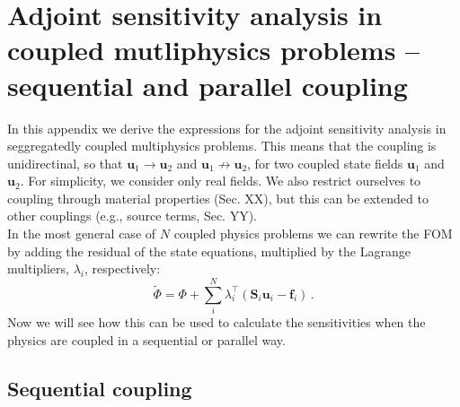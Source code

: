 \section{Adjoint sensitivity analysis in coupled mutliphysics problems -- sequential and parallel coupling}\label{app:appendix1}

In this appendix we derive the expressions for the adjoint sensitivity analysis in seggregatedly coupled multiphysics problems.
 This means that the coupling is unidirectinal, so that $\mathbf{u}_1 \to \mathbf{u}_2$ and $\mathbf{u}_1 \not\to \mathbf{u}_2$, for two
 coupled state fields $\mathbf{u}_1$ and $\mathbf{u}_2$. For simplicity, we consider
only real fields. We also restrict ourselves to coupling through material properties (Sec. XX), but this can be extended to other couplings
(e.g., source terms, Sec. YY).\\

In the most general case of $N$ coupled physics problems we can rewrite the FOM by adding the residual
of the state equations, multiplied by the Lagrange multipliers, $\lambda_i$, 
respectively:
\begin{equation}\label{eq:adj_init}
    \tilde{\Phi} =\Phi + \sum^N_i \lambda_{i}^{\top}\left(\mathbf{S}_i \mathbf{u}_i -\mathbf{f}_i\right)\,.
\end{equation}
Now we will see how this can be used to calculate the sensitivities when the physics are coupled in a sequential or parallel way.

\subsection{Sequential coupling}

